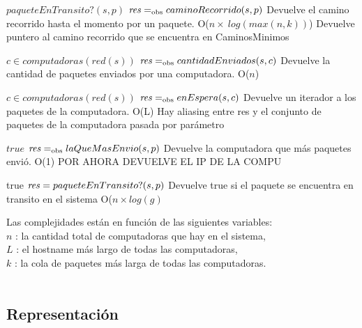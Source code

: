  {$paqueteEnTransito?(s,p)$}
 {$\text{\textit{res}} =_{\mathrm{obs}} caminoRecorrido(s,p)$}
 {Devuelve el camino recorrido hasta el momento por un paquete.}
 {O($n \times\  log(max(n,k))$)}
 {Devuelve puntero al camino recorrido que se encuentra en CaminosMinimos}

 {$c \in computadoras(red(s))$}
 {$\text{\textit{res}} =_{\mathrm{obs}} cantidadEnviados(s,c)$}
 {Devuelve la cantidad de paquetes enviados por una computadora.}
 {O($n$)} %
{}

 
 {$c \in computadoras(red(s))$}
 {$\text{\textit{res}} =_{\mathrm{obs}} enEspera(s,c)$}
 {Devuelve un iterador a los paquetes de la computadora.}
 {O(L)}
 {Hay aliasing entre res y el conjunto de paquetes de la computadora pasada por parámetro}

 
 {$true$}
 {$\text{\textit{res}} =_{\mathrm{obs}} laQueMasEnvio(s,p)$}
 {Devuelve la computadora que más paquetes envió.}
 {O(1)}
 {POR AHORA DEVUELVE EL IP DE LA COMPU}
 

 
{true}
{$\text{\textit{res}} = paqueteEnTransito?(s,p)$}
{Devuelve true si el paquete se encuentra en transito en el sistema}
{O($n \times log(g)$}
 {}

 
Las complejidades están en función de las siguientes variables:\\
$n$ : la cantidad total de computadoras que hay en el sistema, \\
$L$ : el hostname más largo de todas las computadoras, \\
$k$ : la cola de paquetes más larga de todas las computadoras. 
\\ \\



\subsection{Representación}


